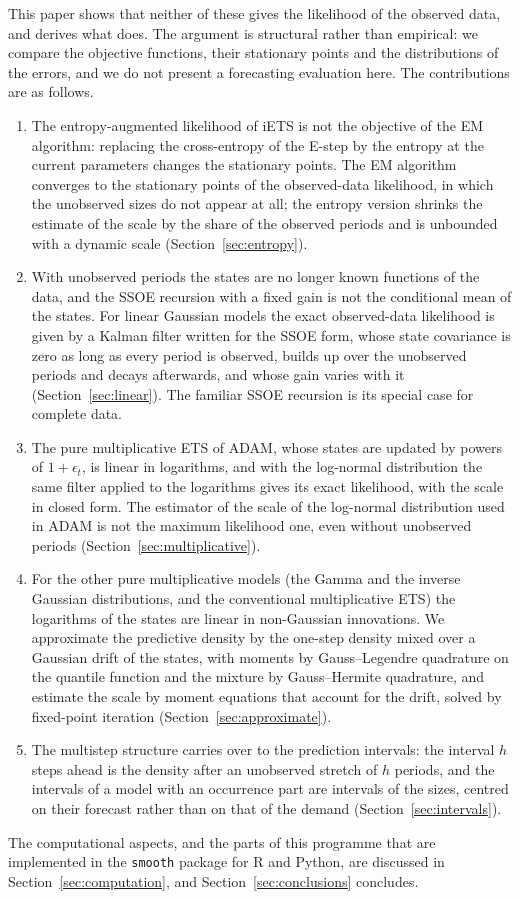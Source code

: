 \documentclass[11pt,a4paper]{article}
\theoremstyle{remark}
\begin{document}
This paper shows that neither of these gives the likelihood of the observed data, and derives what
does. The argument is structural rather than empirical: we compare the objective functions, their
stationary points and the distributions of the errors, and we do not present a forecasting
evaluation here. The contributions are as follows.
\begin{enumerate}
\item The entropy-augmented likelihood of iETS is not the objective of the EM algorithm: replacing
the cross-entropy of the E-step by the entropy at the current parameters changes the stationary
points. The EM algorithm converges to the stationary points of the observed-data likelihood, in which
the unobserved sizes do not appear at all; the entropy version shrinks the estimate of the scale by
the share of the observed periods and is unbounded with a dynamic scale
(Section~\ref{sec:entropy}).
\item With unobserved periods the states are no longer known functions of the data, and the SSOE
recursion with a fixed gain is not the conditional mean of the states. For linear Gaussian models the
exact observed-data likelihood is given by a Kalman filter written for the SSOE form, whose state
covariance is zero as long as every period is observed, builds up over the unobserved periods and
decays afterwards, and whose gain varies with it (Section~\ref{sec:linear}). The familiar SSOE
recursion is its special case for complete data.
\item The pure multiplicative ETS of ADAM, whose states are updated by powers of $1+\epsilon_t$, is
linear in logarithms, and with the log-normal distribution the same filter applied to the logarithms
gives its exact likelihood, with the scale in closed form. The estimator of the scale of the
log-normal distribution used in ADAM is not the maximum likelihood one, even without unobserved
periods (Section~\ref{sec:multiplicative}).
\item For the other pure multiplicative models (the Gamma and the inverse Gaussian distributions,
and the conventional multiplicative ETS) the logarithms of the states are linear in non-Gaussian
innovations. We approximate the predictive density by the one-step density mixed over a Gaussian
drift of the states, with moments by Gauss--Legendre quadrature on the quantile function and the
mixture by Gauss--Hermite quadrature, and estimate the scale by moment equations that account for
the drift, solved by fixed-point iteration (Section~\ref{sec:approximate}).
\item The multistep structure carries over to the prediction intervals: the interval $h$ steps ahead
is the density after an unobserved stretch of $h$ periods, and the intervals of a model with an
occurrence part are intervals of the sizes, centred on their forecast rather than on that of the
demand (Section~\ref{sec:intervals}).
\end{enumerate}
The computational aspects, and the parts of this programme that are implemented in the
\texttt{smooth} package for R and Python, are discussed in Section~\ref{sec:computation}, and
Section~\ref{sec:conclusions} concludes.
\end{document}
